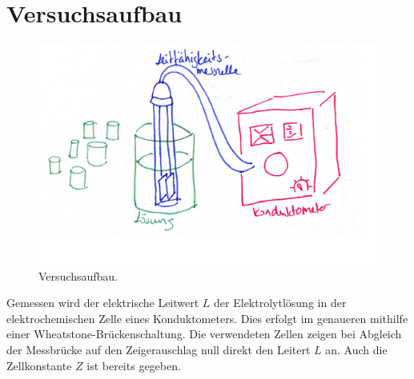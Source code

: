 \documentclass[12pt,a4paper,titlepage,headinclude,bibtotoc]{scrartcl}
\begin{document}
\newpage
\section{Versuchsaufbau}
\begin{figure} [h!]
\begin{center}
\includegraphics[scale=1]{Versuchsaufbau.png} \end{center}
\caption {Versuchsaufbau.}
\end{figure}

Gemessen wird der elektrische Leitwert $L$ der Elektrolytlösung in der elektrochemischen Zelle eines Konduktometers. Dies erfolgt im genaueren mithilfe einer Wheatstone-Brückenschaltung. Die verwendeten Zellen zeigen bei Abgleich der Messbrücke auf den Zeigerauschlag null direkt den Leitert $L$ an. Auch die Zellkonstante $Z$ ist bereits gegeben.
\end{document}
